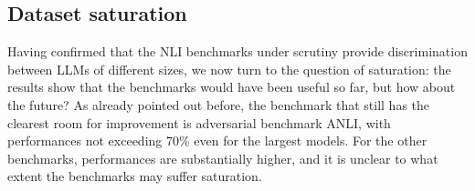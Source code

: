 \begin{table}
\centering
{}
\caption{\textbf{Monotonicity values.} Monotonicity values for the 8B and 70B models during the course of the training. We report monotonicity both for accuracy ($mon_{ACC}$) and nll of the correct answer ($mon_{NLL}$).}
\label{tab:monotonicity}
\end{table}

\subsection{Dataset saturation}\label{subsec:saturation}
Having confirmed that the NLI benchmarks under scrutiny provide discrimination between LLMs of different sizes, we now turn to the question of saturation: the results show that the benchmarks would have been useful so far, but how about the future?
As already pointed out before, the benchmark that still has the clearest room for improvement is adversarial benchmark ANLI, with performances not exceeding 70\% even for the largest models.
For the other benchmarks, performances are substantially higher, and it is unclear to what extent the benchmarks may suffer saturation.

